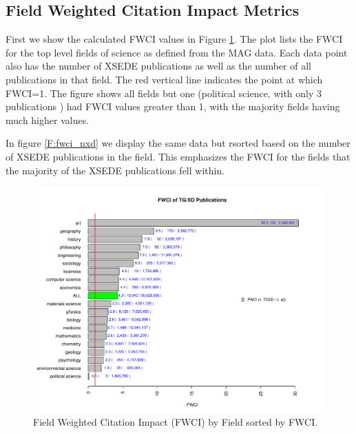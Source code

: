 \documentclass{sig-alternate}
\begin{document}
\subsection{Field Weighted Citation Impact Metrics}

First we show the calculated FWCI values in Figure \ref{F:fwci_fwci}. The plot
lists the FWCI for the top level fields of science as defined from the MAG data.
Each data point also has the number of XSEDE publications as well as the number of
all publications in that field. The red vertical line indicates the point at which 
FWCI=1. The figure shows all fields but one (political science, with only 3 publications
) had FWCI values greater than 1, with the majority fields having much higher values.

In figure \ref{F:fwci_nxd} we display the same data but rsorted 
based on the number of XSEDE publications in the field. This emphasizes the FWCI
for the fields that the majority of the XSEDE publications fell within.

\begin{figure}[htb!]
    \includegraphics[width=0.95\columnwidth]{images/fwci_fwci.pdf}
    \caption{Field Weighted Citation Impact (FWCI) by Field sorted by FWCI.}
    \label{F:fwci_fwci}
\end{figure}
\end{document}
